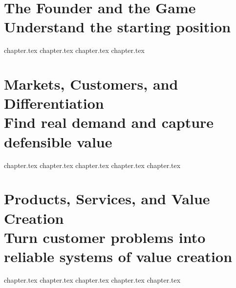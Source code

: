 \documentclass[10pt,letterpaper,twoside,openright,twocolumn]{book}
\begin{document}
  \clearpage
  \tableofcontents
  \cleardoublepage

  
  \cleardoublepage

  \twocolumn
  \mainmatter
  \justifying
  \part[The Founder and the Game]{The Founder and the Game\\[0.4ex]\fontsize{13}{17}\selectfont\mdseries\color{BayesSecondary}Understand the starting position}
  {chapter.tex}
  {chapter.tex}
  {chapter.tex}
  {chapter.tex}

  \part[Markets, Customers, and Differentiation]{Markets, Customers, and Differentiation\\[0.4ex]\fontsize{13}{17}\selectfont\mdseries\color{BayesSecondary}Find real demand and capture defensible value}
  {chapter.tex}
  {chapter.tex}
  {chapter.tex}
  {chapter.tex}
  {chapter.tex}

  \part[Products, Services, and Value Creation]{Products, Services, and Value Creation\\[0.4ex]\fontsize{13}{17}\selectfont\mdseries\color{BayesSecondary}Turn customer problems into reliable systems of value creation}
  {chapter.tex}
  {chapter.tex}
  {chapter.tex}
  {chapter.tex}
  {chapter.tex}
\end{document}
